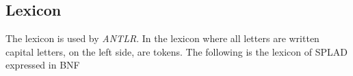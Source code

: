 \subsection{Lexicon}
The lexicon is used by \textit{ANTLR}. In the lexicon where all letters are written capital letters, on the left side, are tokens. The following is the lexicon of SPLAD expressed in BNF